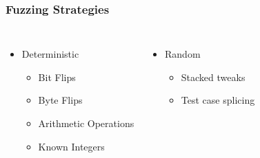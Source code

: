 \begin{frame}
\frametitle{Fuzzing Strategies}
\begin{columns}[t]
\begin{itemize}
\item{Deterministic}
	\begin{itemize}
	\item{Bit Flips}
	\item{Byte Flips}
	\item{Arithmetic Operations}
	\item{Known Integers}	
	\end{itemize}
\end{itemize}
\begin{itemize}
\item{Random}
	\begin{itemize}
	\item{Stacked tweaks}
	\item{Test case splicing}
	\end{itemize}

\end{itemize}
\end{columns}
\end{frame}
